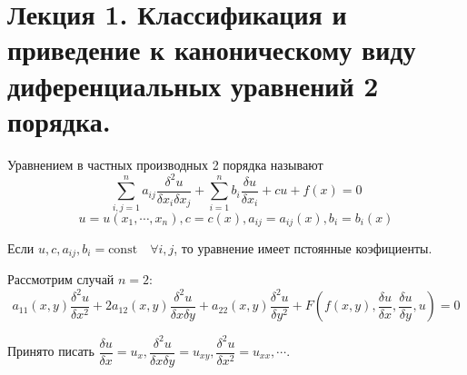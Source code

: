 \section*{Лекция 1. Классификация и приведение к каноническому виду диференциальных уравнений 2 порядка.}

\begin{definition}
    Уравнением в частных производных 2 порядка называют
    $$ \sum_{i, j = 1}^{n} a_{ij} \dfrac{\delta ^ 2 u}{\delta x_i \delta x_j} + \sum_{i = 1}^{n} b_i \dfrac{\delta u}{\delta x_i} + cu + f(x) = 0 $$
    $$ u = u(x_1, \cdots, x_n), c = c(x), a_{ij} = a_{ij} (x), b_i = b_i(x) $$
\end{definition}
Если $ u, c, a_{ij}, b_{i} = \text{const} \quad \forall i, j $, то
уравнение имеет пстоянные коэфициенты. \par
Рассмотрим случай $n = 2$:
$$ a_{11} (x, y) \dfrac{\delta ^ 2 u}{\delta x^2} + 2 a_{12}(x, y) \dfrac{\delta ^ 2 u}{\delta x \delta y} + a_{22} (x, y) \dfrac{\delta ^ 2 u}{\delta y^2} + F(f(x, y), \dfrac{\delta u}{\delta x}, \dfrac{\delta u}{\delta y}, u) = 0 $$
\begin{remark}
    Принято писать $\dfrac{\delta u}{\delta x} = u_x, \dfrac{\delta ^ 2 u}{\delta x \delta y} = u_{xy}, \dfrac{\delta ^ 2 u}{\delta x ^ 2} = u_{xx}, \cdots. $
\end{remark}

